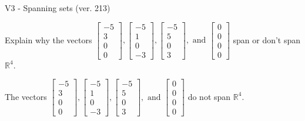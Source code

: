\begin{exercise}
  \begin{exerciseTitle}V3 - Spanning sets (ver. 213)\end{exerciseTitle}
  \begin{exerciseStatement}
    Explain why the vectors \(\left[\begin{array}{r}
-5 \\
3 \\
0 \\
0
\end{array}\right] , \left[\begin{array}{r}
-5 \\
1 \\
0 \\
-3
\end{array}\right] , \left[\begin{array}{r}
-5 \\
5 \\
0 \\
3
\end{array}\right] , \text{ and } \left[\begin{array}{r}
0 \\
0 \\
0 \\
0
\end{array}\right]\) span or don't span \(\mathbb{R}^4\). 
	


  \end{exerciseStatement}
  \begin{exerciseAnswer}
   The vectors \(\left[\begin{array}{r}
-5 \\
3 \\
0 \\
0
\end{array}\right] , \left[\begin{array}{r}
-5 \\
1 \\
0 \\
-3
\end{array}\right] , \left[\begin{array}{r}
-5 \\
5 \\
0 \\
3
\end{array}\right] , \text{ and } \left[\begin{array}{r}
0 \\
0 \\
0 \\
0
\end{array}\right]\) 
  	 do not  
	span \(\mathbb{R}^4\).
  


  \end{exerciseAnswer}
\end{exercise}